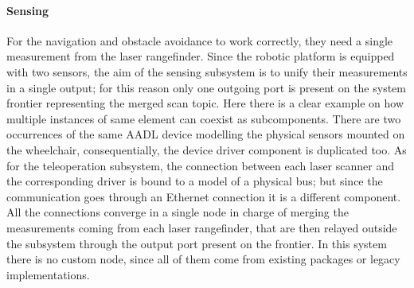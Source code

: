 \paragraph{Sensing} For the navigation and obstacle avoidance to work correctly, they need a single measurement from the laser rangefinder. Since the robotic platform is equipped with two sensors, the aim of the sensing subsystem is to unify their measurements in a single output; for this reason only one outgoing port is present on the system frontier representing the merged scan topic. Here there is a clear example on how multiple instances of same element can coexist as subcomponents. There are two occurrences of the same AADL device modelling the physical sensors mounted on the wheelchair, consequentially, the device driver component is duplicated too. As for the teleoperation subsystem, the connection between each laser scanner and the corresponding driver is bound to a model of a physical bus; but since the communication goes through an Ethernet connection it is a different component. All the connections converge in a single node in charge of merging the measurements coming from each laser rangefinder, that are then relayed outside the subsystem through the output port present on the frontier. In this system there is no custom node, since all of them come from existing packages or legacy implementations.

